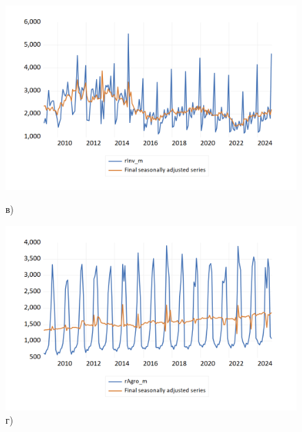 \documentclass[a4paper, 14pt]{extreport}
\numberwithin{equation}{section}
\numberwithin{equation}{section}
\begin{document}
\begin{figure}[h!]
	\begin{minipage}{0.5\textwidth}
		\centering
		\includegraphics[scale=0.4]{images/image18}
		\caption*{в)}
	\end{minipage}%
	\hfill %
	\begin{minipage}{0.5\textwidth}
		\centering
		\includegraphics[scale=0.4]{images/image19}
		\caption*{г)}
	\end{minipage}%
	

\end{figure}
\end{document}
